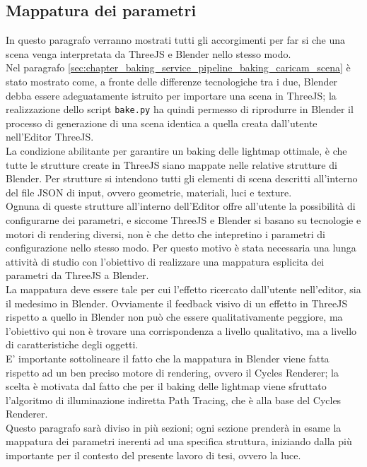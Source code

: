 \subsection{Mappatura dei parametri}
\label{sec:chapter_baking_service_pipeline_baking_mapp_parametri}

In questo paragrafo verranno mostrati tutti gli accorgimenti per far si che una scena venga interpretata da ThreeJS e Blender nello stesso modo. 
\\
Nel paragrafo \ref{sec:chapter_baking_service_pipeline_baking_caricam_scena} è stato mostrato come, a fronte delle differenze tecnologiche tra i due, Blender debba essere adeguatamente istruito per importare una scena in ThreeJS;  la realizzazione dello script \texttt{bake.py} ha quindi permesso di riprodurre in Blender il processo di generazione di una scena identica a quella creata dall’utente nell’Editor ThreeJS. 
\\
La condizione abilitante per garantire un baking delle lightmap ottimale, è che tutte le strutture create in ThreeJS siano mappate nelle relative strutture di Blender. Per strutture si intendono tutti gli elementi di scena descritti all’interno del file JSON di input, ovvero geometrie, materiali, luci e texture.
\\ 
Ognuna di queste strutture all’interno dell’Editor offre all’utente la possibilità di configurarne dei parametri, e siccome ThreeJS e Blender si basano su tecnologie e motori di rendering diversi, non è che detto che intepretino i parametri di configurazione nello stesso modo. Per questo motivo è stata necessaria una lunga attività di studio con l’obiettivo di realizzare una mappatura esplicita dei parametri da ThreeJS a Blender. 
\\
La mappatura deve essere tale per cui l’effetto ricercato dall’utente nell’editor, sia il medesimo in Blender. Ovviamente il feedback visivo di un effetto in ThreeJS rispetto a quello in Blender non può che essere qualitativamente peggiore, ma l’obiettivo qui non è trovare una corrispondenza a livello qualitativo, ma a livello di caratteristiche degli oggetti. 
\\
E’ importante sottolineare il fatto che la mappatura in Blender viene fatta rispetto ad un ben preciso motore di rendering, ovvero il Cycles Renderer; la scelta è motivata dal fatto che per il baking delle lightmap viene sfruttato l’algoritmo di illuminazione indiretta Path Tracing, che è alla base del Cycles Renderer. 
\\
Questo paragrafo sarà diviso in più sezioni; ogni sezione prenderà in esame la mappatura dei parametri inerenti ad una specifica struttura, iniziando dalla più importante per il contesto del presente lavoro di tesi, ovvero la luce. 
